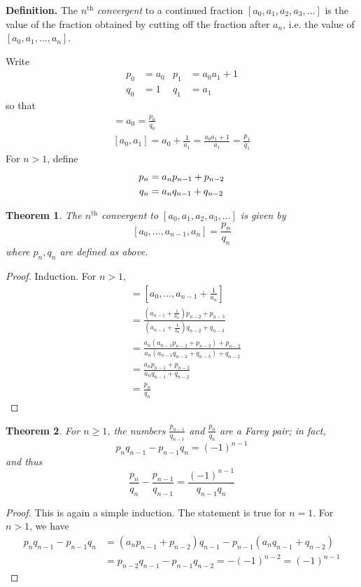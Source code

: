 \documentclass[12pt]{article}
\newtheorem{thm}{Theorem}
\theoremstyle{definition}
\begin{document}
\textbf{Definition. }The $n^{\mathrm{th}}$ \emph{convergent} to a continued fraction $[a_0,a_1,a_2,a_3,\ldots]$ is the value of the fraction obtained by cutting off the fraction after $a_n$, i.e. the value of $[a_0,a_1,\ldots,a_n]$.

Write
\begin{align*}
p_0&=a_0 & p_1 &= a_0 a_1+1\\
q_0 &= 1 & q_1 &= a_1
\end{align*}
so that
\begin{gather*}
[a_0]=a_0 =\frac{p_0}{q_0}\\
[a_0,a_1]=a_0+\frac{1}{a_1} = \frac{a_0a_1+1}{a_1}=\frac{p_1}{q_1}
\end{gather*}
For $n>1$, define
\begin{align} \label{pq}
p_n &= a_n p_{n-1}+p_{n-2}\\
q_n &= a_n q_{n-1}+q_{n-2}\notag
\end{align}

\begin{thm} The $n^{\mathrm{th}}$ convergent to $[a_0,a_1,a_2,a_3,\ldots]$ is given by
\[[a_0,\ldots,a_{n-1},a_n]=\frac{p_n}{q_n}\]
where $p_n, q_n$ are defined as above.
\end{thm}
\begin{proof} Induction. For $n>1$,
\begin{align*}[a_0,\ldots,a_{n-1},a_n] &=[a_0,\ldots,a_{n-1}+\frac{1}{a_n}]\\
&=\frac{\left(a_{n-1}+\frac{1}{a_n}\right)p_{n-2}+p_{n-3}}{\left(a_{n-1}+\frac{1}{a_n}\right)q_{n-2}+q_{n-3}}\\
&=\frac{a_n(a_{n-1}p_{n-2}+p_{n-3})+p_{n-2}}{a_n(a_{n-1}q_{n-2}+q_{n-3})+q_{n-2}}\\
&=\frac{a_n p_{n-1}+p_{n-2}}{a_n q_{n-1}+q_{n-2}}\\
&=\frac{p_n}{q_n}
\end{align*}
\end{proof}

\begin{thm} For $n\geq 1$, the numbers $\frac{p_{n-1}}{q_{n-1}}$ and $\frac{p_n}{q_n}$ are a Farey pair; in fact,
\begin{equation}\label{pnqnm1}p_nq_{n-1}-p_{n-1}q_n=(-1)^{n-1}\end{equation}
and thus
\begin{equation}\label{pnqn}\frac{p_n}{q_n}-\frac{p_{n-1}}{q_{n-1}}=\frac{(-1)^{n-1}}{q_{n-1}q_n}\end{equation}
\end{thm}
\begin{proof}
This is again a simple induction. The statement is true for $n=1$. For $n>1$, we have
\begin{align*}
p_nq_{n-1}-p_{n-1}q_n &=(a_n p_{n-1}+p_{n-2})q_{n-1} - p_{n-1}(a_n q_{n-1}+q_{n-2}) \\
&= p_{n-2}q_{n-1} - p_{n-1}q_{n-2} = -(-1)^{n-2} = (-1)^{n-1}
\end{align*}
\end{proof}
\end{document}
